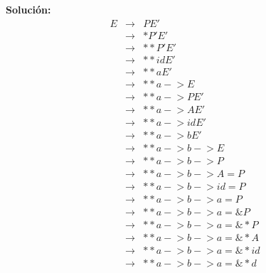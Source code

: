 \begin{enumerate}
\textbf{Solución:}
\begin{eqnarray*}
        E &\to& PE'\\
        &\to& *P'E'\\
        &\to& **P'E'\\
        &\to& **idE'\\
        &\to& **aE'\\
        &\to& ** a -\!> E\\
        &\to& ** a -\!> PE'\\
        &\to& ** a -\!> AE'\\
        &\to& ** a -\!> idE'\\
        &\to& ** a -\!> bE'\\
        &\to& ** a -\!> b -\!> E\\
        &\to& ** a -\!> b -\!> P\\
        &\to& ** a -\!> b -\!> A=P\\
        &\to& ** a -\!> b -\!> id=P\\
        &\to& ** a -\!> b -\!> a=P\\
        &\to& ** a -\!> b -\!> a=\&P\\
        &\to& ** a -\!> b -\!> a=\&*P\\
        &\to& ** a -\!> b -\!> a=\&*A\\
        &\to& ** a -\!> b -\!> a=\&*id\\
        &\to& ** a -\!> b -\!> a=\&*d\\
\end{eqnarray*}
\end{enumerate}
